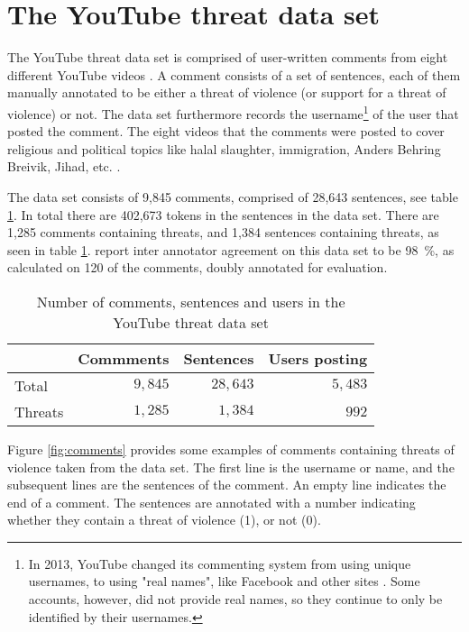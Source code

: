 \documentclass[11pt,letterpaper]{article}
\newcommand{\tov}{threat of violence}
\newcommand{\tovs}{threats of violence}
\newcommand{\ds}{the YouTube threat data set}
\begin{document}
\section{The YouTube threat data set}
\label{sec:data}
The YouTube threat data set is comprised of user-written comments from
eight different YouTube videos \cite{hammer2014}. A comment
consists of a set of sentences, each of them manually annotated to be
either a \tov{} (or support for a \tov{}) or not. The data set
furthermore records the username\footnote{In 2013, YouTube changed its
  commenting system from using unique usernames, to using "real
  names", like Facebook and other sites \cite{youtube2013}. Some
  accounts, however, did not provide real names, so they continue to
  only be identified by their usernames.} of the user that posted the
comment. The eight videos that the comments were posted to cover religious and political topics like halal slaughter, immigration,
Anders Behring Breivik, Jihad, etc. \cite{hammer2014}. 

The data set consists of 9,845 comments, comprised of 28,643
sentences, see table \ref{tab:dataset}. In total there are 402,673
tokens in the sentences in the data set. There are 1,285 comments
containing threats, and 1,384 sentences containing threats, as seen in
table \ref{tab:dataset}.  \cite{hammer2014} report inter annotator
agreement on this data set to be 98~\%, as calculated on 120 of the
comments, doubly annotated for evaluation.

\begin{table}
\begin{center}
\begin{tabular}{lrrr}
  \toprule
  
  & Commments  & Sentences  & Users posting \\
  \midrule
	
  
  Total  & $9,845$  & $28,643$  & $5,483$  \\
  Threats  & $1,285$  & $1,384$  & $992$  \\
  \bottomrule

\end{tabular}
\end{center}
\caption{Number of comments, sentences and users in \ds{}}
\label{tab:dataset}
\end{table}

Figure \ref{fig:comments} provides some examples of comments containing
\tovs{} taken from the data set. The first line is the username or
name, and the subsequent lines are the sentences of the comment. An
empty line indicates the end of a comment. The sentences are annotated
with a number indicating whether they contain a \tov{} (1), or not
(0).
\end{document}
